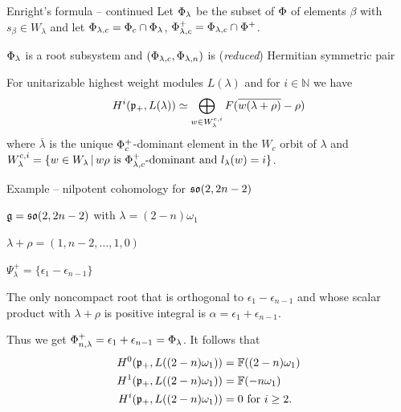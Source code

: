 \documentclass[10pt]{beamer}
\begin{document}
\begin{frame}{Enright's formula -- continued}
 Let $\Phi_\lambda$ be the subset of $\Phi$ of elements $\beta$ with $s_\beta\in W_\lambda$ and let $\Phi_{\lambda,c} = \Phi_c \cap \Phi_\lambda$, $\Phi_{\lambda,c}^+ = \Phi_{\lambda,c} \cap \Phi^+$.

\pause 

$\Phi_\lambda$ is a root subsystem and $(\Phi_{\lambda,c}, \Phi_{\lambda,n})$ is (\emph{reduced}) Hermitian symmetric pair

\pause
 
\begin{theorem}
 For unitarizable highest weight modules $L(\lambda)$ and for $i\in \mathbb{N}$ we have
\begin{equation*}
 H^i(\mathfrak{p}_+, L(\lambda))\simeq \bigoplus_{w\in W^{c,i}_\lambda} F(\overline{w(\lambda+\rho)} - \rho)
\end{equation*}
where  $\overline{\lambda}$ is the unique $\Phi_c^+$-dominant element in the $W_c$ orbit of $\lambda$ and  $W^{c,i}_\lambda = \{ w \in W_\lambda \, |\, w \rho \text{ is } \Phi^+_{\lambda, c}\text{-dominant and } l_\lambda(w)=i \}$.
\end{theorem}

\end{frame}


\begin{frame}{Example -- nilpotent cohomology for $ \mathfrak{so}(2,2n-2)$}

$\mathfrak{g} = \mathfrak{so}(2,2n-2)$ with $\lambda = (2-n)\omega_1$

$\lambda + \rho = (1,n-2,\ldots,1,0)$

 $\Psi_\lambda^+ = \{ \epsilon_1 - \epsilon_{n-1}\}$

The only noncompact root that is orthogonal to $\epsilon_1 -  \epsilon_{n-1}$ and whose scalar product with $\lambda + \rho$ is positive integral is $\alpha = \epsilon_1 + \epsilon_{n-1}$. 

Thus we get $\Phi_{n,\lambda}^+ = \epsilon_1 + \epsilon_{n-1} = \Phi_\lambda$. It follows that
\begin{align*}
 H^0(\mathfrak{p}_+,L((2-n)\omega_1)) &= \mathbb{F}((2-n)\omega_1)\\
 H^1(\mathfrak{p}_+,L((2-n)\omega_1)) &= \mathbb{F}(-n\omega_1)\\
 H^i(\mathfrak{p}_+,L((2-n)\omega_1)) &= 0 \text{ for } i\geq 2.
\end{align*} 
\end{frame}
\end{document}
